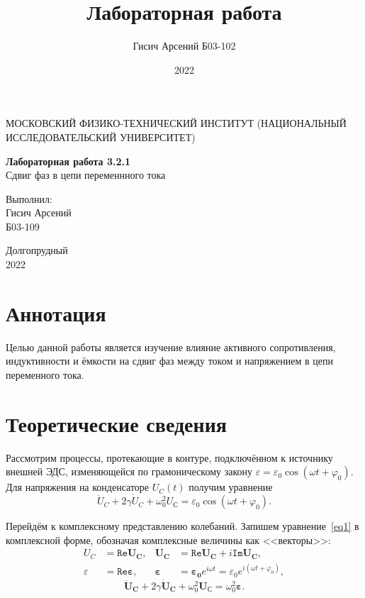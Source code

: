 \documentclass[a4paper, 12pt]{article}
\title{Лабораторная работа}
\author{Гисич Арсений Б03-102}
\date{2022}
\begin{document}
	\begin{center}
		{\large МОСКОВСКИЙ ФИЗИКО-ТЕХНИЧЕСКИЙ ИНСТИТУТ (НАЦИОНАЛЬНЫЙ ИССЛЕДОВАТЕЛЬСКИЙ УНИВЕРСИТЕТ)}
	\end{center}
	\vspace{5 cm}
	{\Large
		\begin{center}
			{\bf Лабораторная работа 3.2.1}\\[0.2 cm]
			Сдвиг фаз в цепи переменнного тока
		\end{center}
	}
	\vspace{4 cm}
	\begin{flushright}
		{\Large Выполнил: \\
			\vspace{0.2 cm}
			Гисич Арсений \\
			\vspace{0.2 cm}
			Б03-109 \\}
	\end{flushright}
	\vspace{9 cm}
	\begin{center}
		Долгопрудный\\[0.1 cm]
		2022
	\end{center}
\thispagestyle{empty}

\section{Аннотация}

Целью данной работы является изучение влияние активного сопротивления, индуктивности и ёмкости на сдвиг фаз между током и напряжением в цепи переменного тока.

\section{Теоретические сведения}

Рассмотрим процессы, протекающие в контуре, подключённом к источнику внешней ЭДС, изменяющейся по грамоническому закону $\varepsilon = \varepsilon_0 \cos{(\omega t + \varphi_0)}$. Для напряжения на конденсаторе $U_C(t)$ получим уравнение 
\begin{equation}\label{eq1}
\ddot{U}_C + 2\gamma \dot{U}_C + \omega_0^2U_С = \varepsilon_0\cos{(\omega t + \varphi_0)}.
\end{equation}

Перейдём к комплексному представлению колебаний. Запишем уравнение~\eqref{eq1} в комплексной форме, обозначая комплексные величины как <<векторы>>:
\begin{align}\label{eq2}
U_C & = \mathtt{Re}\mathbf{U_C}, & \mathbf{U_C} & = \mathtt{Re}\mathbf{U_C} + i\mathtt{Im}\mathbf{U_C}, \\
\varepsilon & = \mathtt{Re}\mathbf{\varepsilon}, & \mathbf{\varepsilon} & = \mathbf{\varepsilon_0}e^{i\omega t} = \varepsilon_0e^{i(\omega t + \varphi_0)},
\end{align}
\begin{equation}\label{eq3}
\mathbf{\ddot{U}_C} + 2\gamma \mathbf{\dot{U}_C} + \omega_0^2\mathbf{U_С} = \omega_0^2\mathbf{\varepsilon}.
\end{equation}
\end{document}
